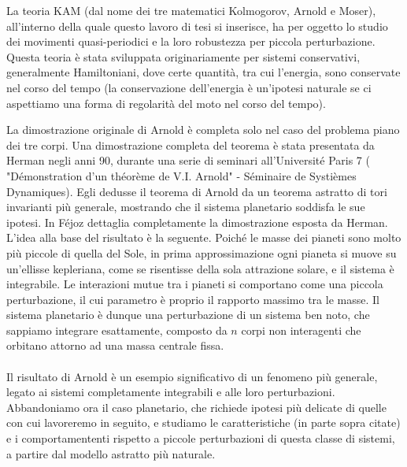 \documentclass[twoside, 11pt]{amsbook}
\newcommand{\0}{{(0)}}
\newcommand{\3}{{(3)}}
\theoremstyle{colonplain}
\theoremstyle{colondefinition}
\theoremstyle{colonremark}
\numberwithin{equation}{chapter}
\begin{document}
La teoria KAM (dal nome dei tre matematici Kolmogorov, Arnold e Moser), all'interno della quale questo lavoro di tesi si inserisce, ha per oggetto lo studio dei movimenti quasi-periodici e la loro robustezza per piccola perturbazione. Questa teoria è stata sviluppata originariamente per sistemi conservativi, generalmente Hamiltoniani, dove certe quantità, tra cui l'energia, sono conservate nel corso del tempo (la conservazione dell'energia è un'ipotesi naturale se ci aspettiamo una forma di regolarità del moto nel corso del tempo). 

La dimostrazione originale di Arnold è completa solo nel caso del problema piano dei tre corpi. 
Una dimostrazione completa del teorema è stata presentata da Herman negli anni 90, durante una serie di seminari all'Université Paris 7 ( "Démonstration d'un théorème de V.I. Arnold" - Séminaire de Systièmes Dynamiques). Egli dedusse il teorema di Arnold da un teorema astratto di tori invarianti più generale, mostrando che il sistema planetario soddisfa le sue ipotesi. In \cite{Fejoz04} Féjoz dettaglia completamente la dimostrazione esposta da Herman.
L'idea alla base del risultato è la seguente. Poiché le masse dei pianeti sono molto più piccole di quella del Sole, in prima approssimazione ogni pianeta si muove su un'ellisse kepleriana, come se risentisse della sola attrazione solare, e il sistema è integrabile. Le interazioni mutue tra i pianeti si comportano come una piccola perturbazione, il cui parametro è proprio il rapporto massimo tra le masse. Il sistema planetario è dunque una perturbazione di un sistema ben noto, che sappiamo integrare esattamente, composto da $n$ corpi non interagenti che orbitano attorno ad una massa centrale fissa. \\ \\
Il risultato di Arnold è un esempio significativo di un fenomeno più generale, legato ai sistemi completamente integrabili e alle loro perturbazioni. \\
Abbandoniamo ora il caso planetario, che richiede ipotesi più delicate di quelle con cui lavoreremo in seguito, e studiamo le caratteristiche (in parte sopra citate) e i comportamententi rispetto a piccole perturbazioni di questa classe di sistemi, a partire dal modello astratto più naturale. \\ \\
\end{document}
